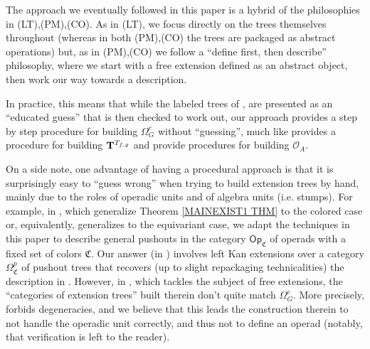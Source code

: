 \documentclass{article}
\begin{document}
The approach we eventually followed in this paper is 
a hybrid of the philosophies in (LT),(PM),(CO).
As in (LT), we focus directly on the trees themselves throughout
(whereas in both (PM),(CO)
the trees are packaged as abstract operations)
but, as in (PM),(CO)
we follow a ``define first, then describe'' philosophy,
where we start with a free extension defined as an 
abstract object,
then work our way towards a description.

In practice, this means that while the labeled trees of 
\cite{BM03},\cite{Cav} are presented as an ``educated guess'' that is then checked to work out,
our approach provides a step by step procedure for 
building $\Omega^e_G$
without ``guessing'', 
much like \cite{BB17} provides a procedure for building
$\bold{T}^{T_{f,g}}$
and \cite{WY18,Ha10,Pe16}
provide procedures for building $\mathcal{O}_A$.

On a side note,
one advantage of having a procedural approach is that it is surprisingly easy to ``guess wrong''
when trying to build extension trees by hand,
mainly due to the roles of operadic units and of algebra units (i.e. stumps).
For example, 
in \cite{BP_HGOP},
which generalize Theorem \ref{MAINEXIST1 THM} to the colored case 
or, equivalently, generalizes 
\cite{Cav} to the equivariant case,
we adapt the techniques in this paper to describe general pushouts
in the category $\mathsf{Op}_{\mathfrak{C}}$ of operads with a fixed set of colors $\mathfrak C$.
Our answer (in \cite[App. A.5]{BP_HGOP}) involves left Kan extensions over a category
$\Omega^p_{\mathfrak{C}}$ of pushout trees 
that recovers (up to slight repackaging technicalities)
the description in 
\cite[App. B]{Cav}.
However, in \cite[App. C]{Cav}, 
which tackles the subject of free extensions, 
the ``categories of extension trees'' built therein
don't quite match $\Omega^e_G$.
More precisely, \cite[App. C]{Cav} forbids degeneracies,
and we believe that this leads the construction therein to
not handle the operadic unit correctly,
and thus not to define an operad (notably, that verification is left to the reader).





{}


\end{document}
